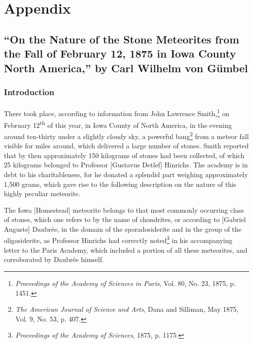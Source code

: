 \documentclass[a4paper, 12pt, oneside]{article}
\begin{document}
\section{Appendix}
\subsection{``On the Nature of the Stone Meteorites from the Fall of February 12, 1875 in Iowa County North America,'' by Carl Wilhelm von Gümbel}
\subsubsection*{Introduction}
\paragraph*{}
There took place, according to information from John Lawrence Smith,\footnote{\emph{Proceedings of the Academy of Sciences in Paris}, Vol. 80, No. 23, 1875, p. 1451.} on February 12\textsuperscript{th} of this year, in Iowa County of North America, in the evening around ten-thirty under a slightly cloudy sky, a powerful bang\footnote{\emph{The American Journal of Science and Arts}, Dana and Silliman, May 1875, Vol. 9, No. 53, p. 407.} from a meteor fall visible for miles around, which delivered a large number of stones. Smith reported that by then approximately 150 kilograms of stones had been collected, of which 25 kilograms belonged to Professor [Gustavus Detlef] Hinrichs. The academy is in debt to his charitableness, for he donated a splendid part weighing approximately 1,500 grams, which gave rise to the following description on the nature of this highly peculiar meteorite.

The Iowa [Homestead] meteorite belongs to that most commonly occurring class of stones, which one refers to by the name of chondrites, or according to [Gabriel Auguste] Daubrée, in the domain of the sporadosiderite and in the group of the oligosiderite, as Professor Hinrichs had correctly noted\footnote{\emph{Proceedings of the Academy of Sciences}, 1875, p. 1175.} in his accompanying letter to the Paris Academy, which included a portion of all these meteorites, and corroborated by Daubrée himself.
\end{document}
